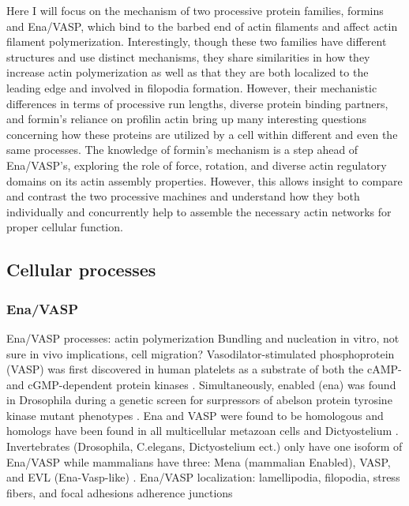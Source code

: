 Here I will focus on the mechanism of two processive protein families, formins and Ena/VASP, which bind to the barbed end of actin filaments and affect actin filament polymerization. Interestingly, though these two families have different structures and use distinct mechanisms, they share similarities in how they increase actin polymerization as well as that they are both localized to the leading edge and involved in filopodia formation. However, their mechanistic differences in terms of processive run lengths, diverse protein binding partners, and formin's reliance on profilin actin bring up many interesting questions concerning how these proteins are utilized by a cell within different and even the same processes. The knowledge of formin's mechanism is a step ahead of Ena/VASP's, exploring the role of force, rotation, and diverse actin regulatory domains on its actin assembly properties. However, this allows insight to compare and contrast the two processive machines and understand how they both individually and concurrently help to assemble the necessary actin networks for proper cellular function. 

\subsection{Cellular processes}\label{ena-formin-cellular-processes}

\subsubsection{Ena/VASP}

Ena/VASP processes: actin polymerization
Bundling and nucleation in vitro, not sure in vivo implications, cell migration?
Vasodilator-stimulated phosphoprotein (VASP) was first discovered in human platelets as a substrate of both the cAMP- and cGMP-dependent protein kinases \citep{halbrugge_analysis_1990}. Simultaneously, enabled (ena) was found in Drosophila during a genetic screen for surpressors of abelson protein tyrosine kinase mutant phenotypes \citep{gertler_genetic_1990}. Ena and VASP were found to be homologous \citep{ahern-djamali_identification_1999} and homologs have been found in all multicellular metazoan cells and Dictyostelium \citep{sebe-pedros_insights_2013}.
Invertebrates (Drosophila, C.elegans, Dictyostelium ect.) only have one isoform of Ena/VASP while mammalians have three: Mena (mammalian Enabled), VASP, and EVL (Ena-Vasp-like) \cite{gertler_mena_1996}.
Ena/VASP localization: lamellipodia, filopodia, stress fibers, and focal adhesions adherence junctions

